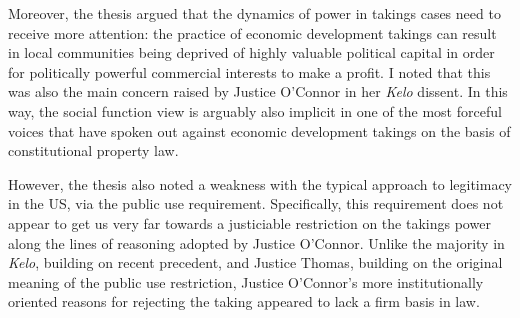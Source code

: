



Moreover, the thesis argued that the dynamics of power in takings cases need to receive more attention: the practice of economic development takings can result in local communities being deprived of highly valuable political capital in order for politically powerful commercial interests to make a profit. I noted that this was also the main concern raised by Justice O'Connor in her {\it Kelo} dissent. In this way, the social function view is arguably also implicit in one of the most forceful voices that have spoken out against economic development takings on the basis of constitutional property law.

However, the thesis also noted a weakness with the typical approach to legitimacy in the US, via the public use requirement. Specifically, this requirement does not appear to get us very far towards a justiciable restriction on the takings power along the lines of reasoning adopted by Justice O'Connor. Unlike the majority in {\it Kelo}, building on recent precedent, and Justice Thomas, building on the original meaning of the public use restriction, Justice O'Connor's more institutionally oriented reasons for rejecting the taking appeared to lack a firm basis in law.

